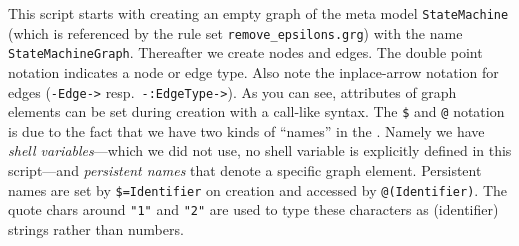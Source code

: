 This script starts with creating an empty graph of the meta model \texttt{StateMachine} (which is referenced by the rule set \texttt{remove\_epsilons.grg}) with the name \texttt{StateMachineGraph}.
Thereafter we create nodes and edges.
The double point notation indicates a node or edge type.
Also note the inplace-arrow notation for edges (\texttt{-Edge->} resp.\ \texttt{-:EdgeType->}).
As you can see, attributes of graph elements can be set during creation with a call-like syntax.
\makeatletter
The \texttt{\$} and \texttt{@} notation is due to the fact that we have two kinds of ``names'' in the \GrShell.
Namely we have \emph{shell variables}---which we did not use, no shell variable is explicitly defined in this script---and \emph{persistent names} that denote a specific graph element.
Persistent names are set by \texttt{\$=Identifier} on creation and accessed by \texttt{@(Identifier)}.
\makeatother
The quote chars around \texttt{"1"} and \texttt{"2"} are used to type these characters as (identifier) strings rather than numbers.

